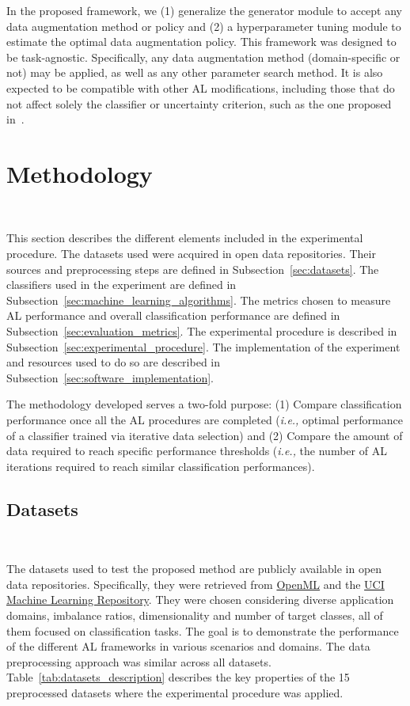 \documentclass[parskip=full]{scrartcl}
\begin{document}
In the proposed framework, we (1) generalize the generator module to accept
any data augmentation method or policy and (2) a hyperparameter tuning module
to estimate the optimal data augmentation policy. This framework was designed
to be task-agnostic. Specifically, any data augmentation method
(domain-specific or not) may be applied, as well as any other parameter search
method. It is also expected to be compatible with other AL modifications,
including those that do not affect solely the classifier or uncertainty
criterion, such as the one proposed in~\cite{Yoo2019}.
 
\section{Methodology}~\label{sec:methodology}

This section describes the different elements included in the experimental
procedure. The datasets used were acquired in open data repositories. Their
sources and preprocessing steps are defined in Subsection~\ref{sec:datasets}.
The classifiers used in the experiment are defined in
Subsection~\ref{sec:machine_learning_algorithms}. The metrics chosen to
measure AL performance and overall classification performance are defined in
Subsection~\ref{sec:evaluation_metrics}. The experimental procedure is
described in Subsection~\ref{sec:experimental_procedure}. The implementation
of the experiment and resources used to do so are described in
Subsection~\ref{sec:software_implementation}.

The methodology developed serves a two-fold purpose: (1) Compare
classification performance once all the AL procedures are completed
(\textit{i.e.,} optimal performance of a classifier trained via iterative data
selection) and (2) Compare the amount of data required to reach specific
performance thresholds (\textit{i.e.,} the number of AL iterations required to
reach similar classification performances).
 
\subsection{Datasets}~\label{sec:datasets}

The datasets used to test the proposed method are publicly available in open
data repositories. Specifically, they were retrieved from
\href{https://www.openml.org/}{OpenML} and the
\href{https://archive.ics.uci.edu/}{UCI Machine Learning Repository}. They
were chosen considering diverse application domains, imbalance ratios,
dimensionality and number of target classes, all of them focused on
classification tasks. The goal is to demonstrate the performance of the
different AL frameworks in various scenarios and domains. The data
preprocessing approach was similar across all datasets.
Table~\ref{tab:datasets_description} describes the key properties of the
15 preprocessed datasets where the experimental procedure was applied. 
 
\end{document}
